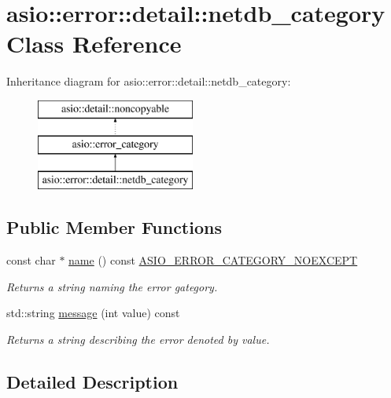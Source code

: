\hypertarget{classasio_1_1error_1_1detail_1_1netdb__category}{}\section{asio\+:\+:error\+:\+:detail\+:\+:netdb\+\_\+category Class Reference}
\label{classasio_1_1error_1_1detail_1_1netdb__category}
Inheritance diagram for asio\+:\+:error\+:\+:detail\+:\+:netdb\+\_\+category\+:\begin{figure}[H]
\begin{center}
\leavevmode
\includegraphics[height=3.000000cm]{classasio_1_1error_1_1detail_1_1netdb__category}
\end{center}
\end{figure}
\subsection*{Public Member Functions}
\begin{DoxyCompactItemize}
\item 
const char $\ast$ \hyperlink{classasio_1_1error_1_1detail_1_1netdb__category_a091c75f98133c610587996e2a4b016bd}{name} () const \hyperlink{config_8hpp_a1e51af6137c0e4e4d686921037649e74}{A\+S\+I\+O\+\_\+\+E\+R\+R\+O\+R\+\_\+\+C\+A\+T\+E\+G\+O\+R\+Y\+\_\+\+N\+O\+E\+X\+C\+E\+P\+T}
\begin{DoxyCompactList}\small\item\em Returns a string naming the error gategory. \end{DoxyCompactList}\item 
std\+::string \hyperlink{classasio_1_1error_1_1detail_1_1netdb__category_a0a9e193d202c335b0072bff1b53246a1}{message} (int value) const 
\begin{DoxyCompactList}\small\item\em Returns a string describing the error denoted by {\ttfamily value}. \end{DoxyCompactList}\end{DoxyCompactItemize}


\subsection{Detailed Description}



